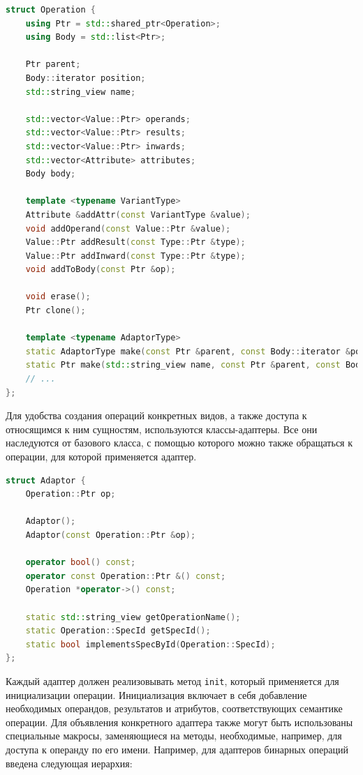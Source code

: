 \begin{lstlisting}[language=C++, caption=Объявление класса операции]
struct Operation {
    using Ptr = std::shared_ptr<Operation>;
    using Body = std::list<Ptr>;

    Ptr parent;
    Body::iterator position;
    std::string_view name;

    std::vector<Value::Ptr> operands;
    std::vector<Value::Ptr> results;
    std::vector<Value::Ptr> inwards;
    std::vector<Attribute> attributes;
    Body body;

    template <typename VariantType>
    Attribute &addAttr(const VariantType &value);
    void addOperand(const Value::Ptr &value);
    Value::Ptr addResult(const Type::Ptr &type);
    Value::Ptr addInward(const Type::Ptr &type);
    void addToBody(const Ptr &op);

    void erase();
    Ptr clone();

    template <typename AdaptorType>
    static AdaptorType make(const Ptr &parent, const Body::iterator &position);
    static Ptr make(std::string_view name, const Ptr &parent, const Body::iterator &position);
    // ...
};
\end{lstlisting}

Для удобства создания операций конкретных видов, а также доступа к относящимся к ним сущностям, используются классы-адаптеры.
Все они наследуются от базового класса, с помощью которого можно также обращаться к операции, для которой применяется адаптер.

\begin{lstlisting}[language=C++, caption=Объявление базового класса адаптера]
struct Adaptor {
    Operation::Ptr op;

    Adaptor();
    Adaptor(const Operation::Ptr &op);

    operator bool() const;
    operator const Operation::Ptr &() const;
    Operation *operator->() const;

    static std::string_view getOperationName();
    static Operation::SpecId getSpecId();
    static bool implementsSpecById(Operation::SpecId);
};
\end{lstlisting}

Каждый адаптер должен реализовывать метод \verb|init|, который применяется для инициализации операции.
Инициализация включает в себя добавление необходимых операндов, результатов и атрибутов, соответствующих семантике операции.
Для объявления конкретного адаптера также могут быть использованы специальные макросы, заменяющиеся на методы, необходимые, например, для доступа к операнду по его имени.
Например, для адаптеров бинарных операций введена следующая иерархия:

